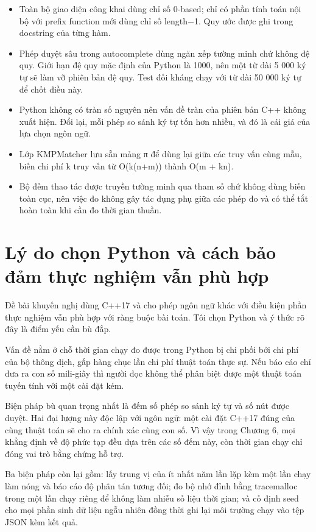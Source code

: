 \begin{itemize}
\item
  Toàn bộ giao diện công khai dùng chỉ số 0-based; chỉ có phần tính toán
  nội bộ với prefix function mới dùng chỉ số length−1. Quy ước được ghi
  trong docstring của từng hàm.
\item
  Phép duyệt sâu trong autocomplete dùng ngăn xếp tường minh chứ không
  đệ quy. Giới hạn đệ quy mặc định của Python là 1000, nên một từ dài 5
  000 ký tự sẽ làm vỡ phiên bản đệ quy. Test đối kháng chạy với từ dài
  50 000 ký tự để chốt điều này.
\item
  Python không có tràn số nguyên nên vấn đề tràn của phiên bản C++ không
  xuất hiện. Đổi lại, mỗi phép so sánh ký tự tốn hơn nhiều, và đó là cái
  giá của lựa chọn ngôn ngữ.
\item
  Lớp KMPMatcher lưu sẵn mảng π để dùng lại giữa các truy vấn cùng mẫu,
  biến chi phí k truy vấn từ O(k(n+m)) thành O(m + kn).
\item
  Bộ đếm thao tác được truyền tường minh qua tham số chứ không dùng biến
  toàn cục, nên việc đo không gây tác dụng phụ giữa các phép đo và có
  thể tắt hoàn toàn khi cần đo thời gian thuần.
\end{itemize}

\section{Lý do chọn Python và cách bảo đảm thực nghiệm vẫn phù hợp}
\label{sec:5-5}

Đề bài khuyến nghị dùng C++17 và cho phép ngôn ngữ khác với điều kiện
phần thực nghiệm vẫn phù hợp với ràng buộc bài toán. Tôi chọn Python và
ý thức rõ đây là điểm yếu cần bù đắp.

Vấn đề nằm ở chỗ thời gian chạy đo được trong Python bị chi phối bởi chi
phí của bộ thông dịch, gấp hàng chục lần chi phí thuật toán thực sự. Nếu
báo cáo chỉ đưa ra con số mili-giây thì người đọc không thể phân biệt
được một thuật toán tuyến tính với một cài đặt kém.

Biện pháp bù quan trọng nhất là đếm số phép so sánh ký tự và số nút được
duyệt. Hai đại lượng này độc lập với ngôn ngữ: một cài đặt C++17 đúng
của cùng thuật toán sẽ cho ra chính xác cùng con số. Vì vậy trong Chương
6, mọi khẳng định về độ phức tạp đều dựa trên các số đếm này, còn thời
gian chạy chỉ đóng vai trò bằng chứng hỗ trợ.

Ba biện pháp còn lại gồm: lấy trung vị của ít nhất năm lần lặp kèm một
lần chạy làm nóng và báo cáo độ phân tán tương đối; đo bộ nhớ đỉnh bằng
tracemalloc trong một lần chạy riêng để không làm nhiễu số liệu thời
gian; và cố định seed cho mọi phần sinh dữ liệu ngẫu nhiên đồng thời ghi
lại môi trường chạy vào tệp JSON kèm kết quả.

